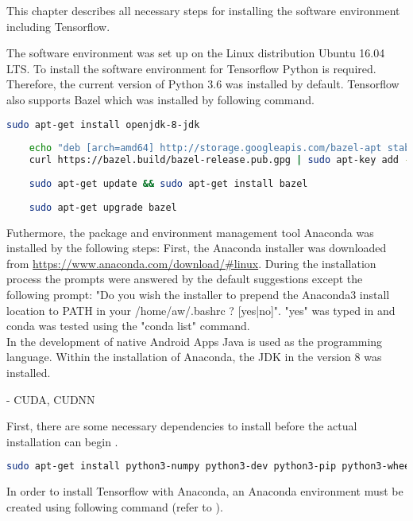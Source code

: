 This chapter describes all necessary steps for installing the software environment including Tensorflow.

The software environment was set up on the Linux distribution Ubuntu 16.04 LTS. To install the software environment for Tensorflow Python is required. Therefore, the current version of Python 3.6 was installed by default. Tensorflow also supports Bazel which was installed by following command.

\begin{lstlisting}[caption=Bazel Installation, label=list:bazel, language=bash]
	sudo apt-get install openjdk-8-jdk
	
	echo "deb [arch=amd64] http://storage.googleapis.com/bazel-apt stable jdk1.8" | sudo tee /etc/apt/				sources.list.d/bazel.list
	curl https://bazel.build/bazel-release.pub.gpg | sudo apt-key add -
	
	sudo apt-get update && sudo apt-get install bazel
	
	sudo apt-get upgrade bazel
\end{lstlisting}	

Futhermore, the package and environment management tool Anaconda was installed by the following steps:
First, the Anaconda installer was downloaded from \url{https://www.anaconda.com/download/#linux}. During the installation process the prompts were answered by the default suggestions except the following prompt: "Do you wish the installer to prepend the Anaconda3 install location to PATH in your /home/aw/.bashrc ? [yes|no]". "yes" was typed in and conda was tested using the "conda list" command. \\

In the development of native Android Apps Java is used as the programming language. Within the installation of Anaconda, the JDK in the version 8 was installed.

 	- CUDA, CUDNN
 	
First, there are some necessary dependencies to install before the actual installation can begin .
\begin{lstlisting}[caption=Installing the dependecies for Tensorflow based on Python 3.n, label=list:python_dependencies, language=bash]
	sudo apt-get install python3-numpy python3-dev python3-pip python3-wheel
\end{lstlisting}

In order to install Tensorflow with Anaconda, an Anaconda environment must be created using following command (refer to ).

